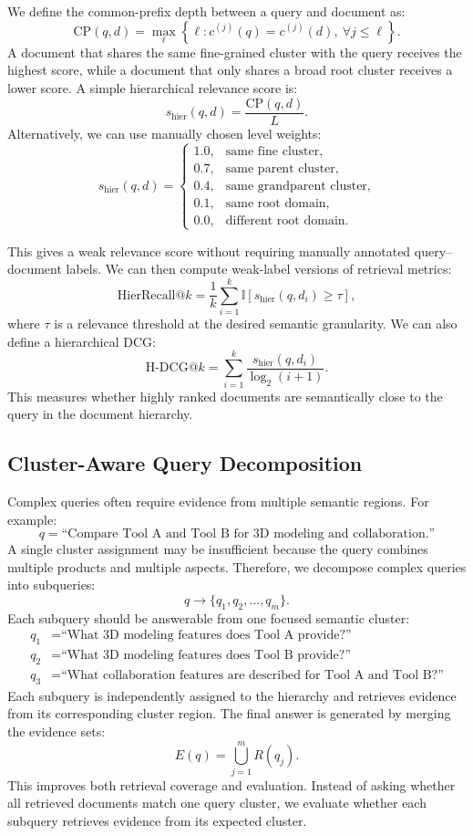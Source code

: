 \documentclass[11pt]{article}
\begin{document}
We define the common-prefix depth between a query and document as:
\[
\text{CP}(q, d) =
\max_{\ell} \left\{ \ell : c^{(j)}(q) = c^{(j)}(d),\ \forall j \leq \ell \right\}.
\]
A document that shares the same fine-grained cluster with the query receives the highest score, while a document that only shares a broad root cluster receives a lower score. A simple hierarchical relevance score is:
\[
s_{\text{hier}}(q,d) = \frac{\text{CP}(q,d)}{L}.
\]
Alternatively, we can use manually chosen level weights:
\[
s_{\text{hier}}(q,d) =
\begin{cases}
1.0, & \text{same fine cluster},\\
0.7, & \text{same parent cluster},\\
0.4, & \text{same grandparent cluster},\\
0.1, & \text{same root domain},\\
0.0, & \text{different root domain}.
\end{cases}
\]

This gives a weak relevance score without requiring manually annotated query--document labels. We can then compute weak-label versions of retrieval metrics:
\[
\text{HierRecall@}k =
\frac{1}{k} \sum_{i=1}^{k} \mathbb{I}\left[s_{\text{hier}}(q,d_i) \geq \tau \right],
\]
where $\tau$ is a relevance threshold at the desired semantic granularity. We can also define a hierarchical DCG:
\[
\text{H-DCG@}k =
\sum_{i=1}^{k} \frac{s_{\text{hier}}(q,d_i)}{\log_2(i+1)}.
\]
This measures whether highly ranked documents are semantically close to the query in the document hierarchy.

\subsection{Cluster-Aware Query Decomposition}

Complex queries often require evidence from multiple semantic regions. For example:
\[
q = \text{``Compare Tool A and Tool B for 3D modeling and collaboration.''}
\]
A single cluster assignment may be insufficient because the query combines multiple products and multiple aspects. Therefore, we decompose complex queries into subqueries:
\[
q \rightarrow \{q_1, q_2, \ldots, q_m\}.
\]
Each subquery should be answerable from one focused semantic cluster:
\[
\begin{aligned}
q_1 &= \text{``What 3D modeling features does Tool A provide?''} \\
q_2 &= \text{``What 3D modeling features does Tool B provide?''} \\
q_3 &= \text{``What collaboration features are described for Tool A and Tool B?''}
\end{aligned}
\]
Each subquery is independently assigned to the hierarchy and retrieves evidence from its corresponding cluster region. The final answer is generated by merging the evidence sets:
\[
E(q) = \bigcup_{j=1}^{m} R(q_j).
\]
This improves both retrieval coverage and evaluation. Instead of asking whether all retrieved documents match one query cluster, we evaluate whether each subquery retrieves evidence from its expected cluster.
\end{document}
